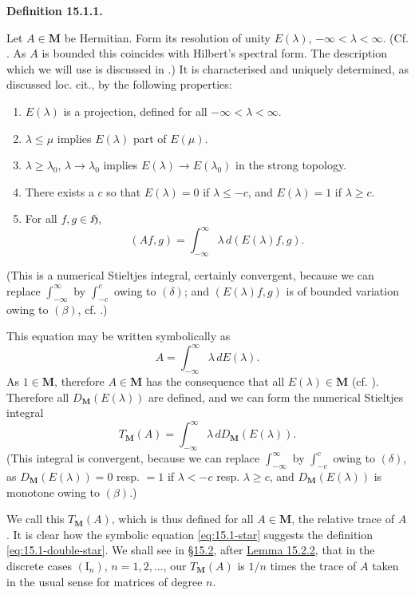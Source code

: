 \documentclass[12pt,b5paper,twoside]{article}
\newcommand{\Hspace}{\mathfrak H}
\newcommand{\M}{\mathbf M}
\newcommand{\Definition}[1]{%
  \par\smallskip\noindent\phantomsection\label{def:#1}\textbf{Definition #1.}\enspace
}
\newcommand{\secref}[1]{\hyperref[sec:#1]{\S#1}}
\newcommand{\lemref}[1]{\hyperref[lem:#1]{Lemma #1}}
\begin{document}
\Definition{15.1.1}
Let \(A\in\M\) be Hermitian. Form its resolution of unity \(E(\lambda)\),
\(-\infty<\lambda<\infty\). (Cf. \cite[p.~92]{ref16}. As \(A\) is bounded
this coincides with Hilbert's spectral form. The description which we will
use is discussed in \cite[pp.~389--390, footnote~42, and p.~418]{ref18}.) It
is characterised and uniquely determined, as discussed loc. cit., by the
following properties:
\begin{enumerate}[leftmargin=2.4em]
\item[$(\alpha)$] \(E(\lambda)\) is a projection, defined for all
  \(-\infty<\lambda<\infty\).
\item[$(\beta)$] \(\lambda\leq\mu\) implies \(E(\lambda)\) part of
  \(E(\mu)\).
\item[$(\gamma)$] \(\lambda\geq\lambda_0\), \(\lambda\to\lambda_0\) implies
  \(E(\lambda)\to E(\lambda_0)\) in the strong topology.
\item[$(\delta)$] There exists a \(c\) so that \(E(\lambda)=0\) if
  \(\lambda\leq-c\),
  and \(E(\lambda)=1\) if \(\lambda\geq c\).
\item[$(\epsilon)$] For all \(f,g\in\Hspace\),
  \[
  (Af,g)=\int_{-\infty}^{\infty}\lambda\,d(E(\lambda)f,g).
  \]
\end{enumerate}
(This is a numerical Stieltjes integral, certainly convergent, because we can
replace \(\int_{-\infty}^{\infty}\) by \(\int_{-c}^{c}\) owing to
\((\delta)\); and \((E(\lambda)f,g)\) is of bounded variation owing to
\((\beta)\), cf.
\cite[p.~93]{ref16}.)

This equation may be written symbolically as
\begin{equation*}
A=\int_{-\infty}^{\infty}\lambda\,dE(\lambda).
\tag{*}\label{eq:15.1-star}
\end{equation*}
As \(1\in\M\), therefore \(A\in\M\) has the consequence that all
\(E(\lambda)\in\M\) (cf. \cite[p.~390]{ref18}). Therefore all
\(D_{\M}(E(\lambda))\) are defined, and we can form the numerical Stieltjes
integral
\begin{equation*}
T_{\M}(A)=\int_{-\infty}^{\infty}\lambda\,dD_{\M}(E(\lambda)).
\tag{**}\label{eq:15.1-double-star}
\end{equation*}
(This integral is convergent, because we can replace
\(\int_{-\infty}^{\infty}\) by \(\int_{-c}^{c}\) owing to \((\delta)\), as
\(D_{\M}(E(\lambda))=0\) resp. \(=1\) if \(\lambda<-c\) resp.
\(\lambda\geq c\), and \(D_{\M}(E(\lambda))\) is monotone owing to
\((\beta)\).)

We call this \(T_{\M}(A)\), which is thus defined for all \(A\in\M\), the
relative trace of \(A\). It is clear how the symbolic equation
\eqref{eq:15.1-star} suggests the definition \eqref{eq:15.1-double-star}.
We shall see in \secref{15.2}, after \lemref{15.2.2}, that in the discrete
cases \((\mathrm I_n)\), \(n=1,2,\ldots\), our \(T_{\M}(A)\) is \(1/n\)
times the trace of \(A\) taken in the usual sense for matrices of degree
\(n\).
\end{document}
